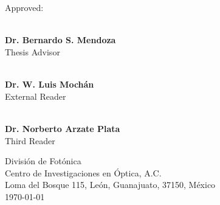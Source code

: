 \begin{center}
\vspace{2cm}
\\
\vspace{0.7cm}
\vspace{0.7cm}
\\
\end{center}
\vfill
{\Large Approved:}
\begin{flushright}
\makebox[0.5\textwidth ]{\hrulefill}\\
\textbf{Dr. Bernardo S. Mendoza}\\ Thesis Advisor
\vspace{1.25cm}

\makebox[0.5\textwidth ]{\hrulefill}\\
\textbf{Dr. W. Luis Moch\'an}\\ External Reader
\vspace{1.25cm}

\makebox[0.5\textwidth ]{\hrulefill}\\
\textbf{Dr. Norberto Arzate Plata}\\Third Reader
\vfill

\begin{center}
{\large Divisi\'on de Fot\'onica\\
Centro de Investigaciones en \'Optica, A.C.\\
Loma del Bosque 115, Le\'on, Guanajuato, 37150, M\'exico\\
\today}
\end{center}
\end{flushright}
